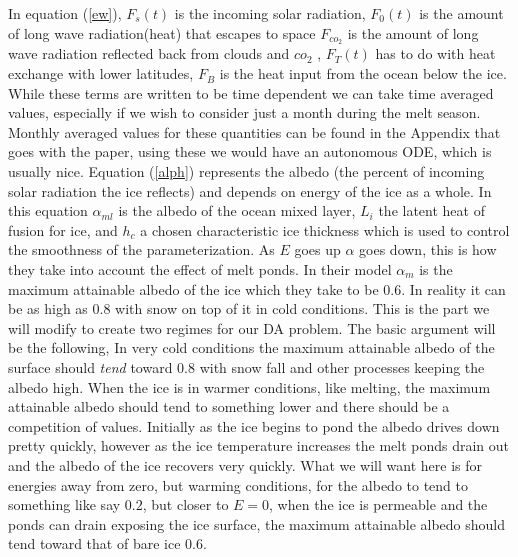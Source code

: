 \documentclass[10pt]{article}
\begin{document}
 In equation (\ref{ew}), $F_s(t)$ is the incoming solar radiation, $F_0(t)$ is the amount of long wave radiation(heat) that escapes to space $F_{co_2}$ is the amount of long wave radiation reflected back from clouds and $co_2$ , $F_T(t)$ has to do with heat exchange with lower latitudes, $F_B$ is the heat input from the ocean below the ice. While these terms are written to be time dependent we can take time averaged values, especially if we wish to consider just a month during the melt season. Monthly averaged values for these quantities can be found in the Appendix that goes with the paper, using these we would have an autonomous ODE, which is usually nice. Equation (\ref{alph}) represents the albedo (the percent of incoming solar radiation the ice reflects) and depends on energy of the ice as a whole. In this equation $\alpha_{ml}$ is the albedo of the ocean mixed layer, $L_i$ the latent heat of fusion for ice, and $h_c$ a chosen characteristic ice thickness which is used to control the smoothness of the parameterization. As $E$ goes up $\alpha$ goes down, this is how they take into account the effect of melt ponds. In their model $\alpha_m$ is the maximum attainable albedo of the ice which they take to be $0.6$. In reality it can be as high as $0.8$ with snow on top of it in cold conditions. This is the part we will modify to create two regimes for our DA problem. The basic argument will be the following, In very cold conditions the maximum attainable albedo of the surface should {\it tend} toward $0.8$ with snow fall and other processes keeping the albedo high. When the ice is in warmer conditions, like melting, the maximum attainable albedo should tend to something lower and there should be a competition of values. Initially as the ice begins to pond the albedo drives down pretty quickly, however as the ice temperature increases the melt ponds drain out and the albedo of the ice recovers very quickly.  %
What we will want here is for energies away from zero, but warming conditions, for the albedo to tend to something like say $0.2$, but closer to $E=0$, when the ice is permeable and the ponds can drain exposing the ice surface, the maximum attainable albedo should tend toward that of bare ice $0.6$.
\end{document}
